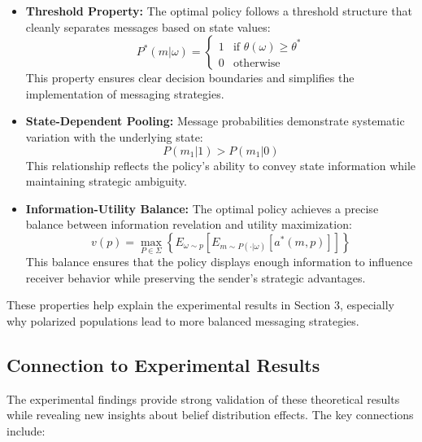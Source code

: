 \documentclass[12pt]{article}
\theoremstyle{plain}
\theoremstyle{definition}
\theoremstyle{remark}
\begin{document}
\begin{itemize}
    \item \textbf{Threshold Property:} The optimal policy follows a threshold structure that cleanly separates messages based on state values:
    \[P^*(m|\omega) = \begin{cases}
        1 & \text{if }\theta(\omega) \geq \theta^*\\
        0 & \text{otherwise}
    \end{cases}\]
    This property ensures clear decision boundaries and simplifies the implementation of messaging strategies.

    \item \textbf{State-Dependent Pooling:} Message probabilities demonstrate systematic variation with the underlying state:
    \[P(m_1|1) > P(m_1|0)\]
    This relationship reflects the policy's ability to convey state information while maintaining strategic ambiguity.

    \item \textbf{Information-Utility Balance:} The optimal policy achieves a precise balance between information revelation and utility maximization:
    \[v(p) = \max_{P\in\Sigma} \left\{E_{\omega\sim p}\left[E_{m\sim P(\cdot|\omega)}[a^*(m,p)]\right]\right\}\]
    This balance ensures that the policy displays enough information to influence receiver behavior while preserving the sender's strategic advantages.
\end{itemize}

These properties help explain the experimental results in Section 3, especially why polarized populations lead to more balanced messaging strategies.

\subsection{Connection to Experimental Results}
The experimental findings provide strong validation of these theoretical results while revealing new insights about belief distribution effects. The key connections include:
\end{document}
